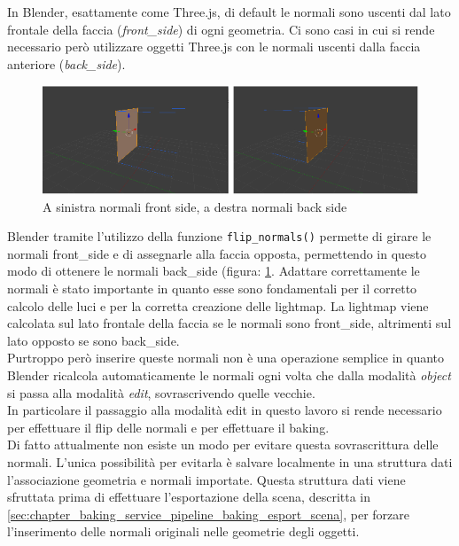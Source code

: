 In Blender, esattamente come Three.js, di default le normali sono uscenti dal lato frontale della faccia (\emph{front\_side}) di ogni geometria. 
Ci sono casi in cui si rende necessario però utilizzare oggetti Three.js con le normali uscenti dalla faccia anteriore (\emph{back\_side}).
\\
\begin{figure}[htb]
 \centering
 \includegraphics[width=1\linewidth]{images/chapter_baking_service/front_back_side.png}\hfill
 \caption[Front side e back side in Blender.]{A sinistra normali front side, a destra normali back side}
 \label{fig:baking_service_front_back_side}
\end{figure}
Blender tramite l’utilizzo della funzione \texttt{flip\_normals()} permette di girare le normali front\_side e di assegnarle alla faccia opposta, permettendo in questo modo di ottenere le normali back\_side (figura: \ref{fig:baking_service_front_back_side}. 
Adattare correttamente le normali è stato importante in quanto esse sono fondamentali per il corretto calcolo delle luci e per la corretta creazione delle lightmap.
La lightmap viene calcolata sul lato frontale della faccia se le normali sono front\_side, altrimenti sul lato opposto se sono back\_side.
\\
Purtroppo però inserire queste normali non è una operazione semplice in quanto Blender ricalcola automaticamente le normali ogni volta che dalla modalità \emph{object} si passa alla modalità \emph{edit}, sovrascrivendo quelle vecchie.
\\
In particolare il passaggio alla modalità edit in questo lavoro si rende necessario per effettuare il flip delle normali e per effettuare il baking.
\\
Di fatto attualmente non esiste un modo per evitare questa sovrascrittura delle normali. L’unica possibilità per evitarla è salvare localmente in una struttura dati l’associazione geometria e normali importate. Questa struttura dati viene sfruttata prima di effettuare l’esportazione della scena, descritta in \ref{sec:chapter_baking_service_pipeline_baking_esport_scena}, per forzare l’inserimento delle normali originali nelle geometrie degli oggetti.
